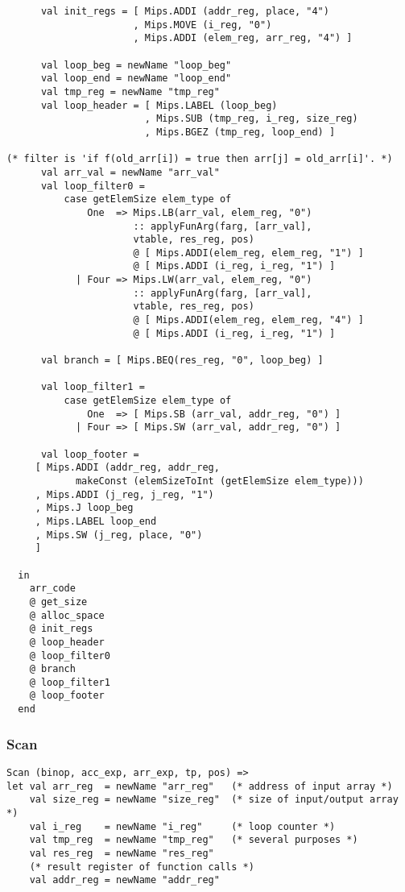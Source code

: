 \documentclass[12pt]{article}
\begin{document}
\begin{center}
\begin{center}
\begin{verbatim}
      val init_regs = [ Mips.ADDI (addr_reg, place, "4")
                      , Mips.MOVE (i_reg, "0")
                      , Mips.ADDI (elem_reg, arr_reg, "4") ]

      val loop_beg = newName "loop_beg"
      val loop_end = newName "loop_end"
      val tmp_reg = newName "tmp_reg"
      val loop_header = [ Mips.LABEL (loop_beg)
                        , Mips.SUB (tmp_reg, i_reg, size_reg)
                        , Mips.BGEZ (tmp_reg, loop_end) ]

(* filter is 'if f(old_arr[i]) = true then arr[j] = old_arr[i]'. *)
      val arr_val = newName "arr_val"
      val loop_filter0 =
          case getElemSize elem_type of
              One  => Mips.LB(arr_val, elem_reg, "0")
                      :: applyFunArg(farg, [arr_val], 
                      vtable, res_reg, pos)
                      @ [ Mips.ADDI(elem_reg, elem_reg, "1") ]
                      @ [ Mips.ADDI (i_reg, i_reg, "1") ]
            | Four => Mips.LW(arr_val, elem_reg, "0")
                      :: applyFunArg(farg, [arr_val], 
                      vtable, res_reg, pos)
                      @ [ Mips.ADDI(elem_reg, elem_reg, "4") ]
                      @ [ Mips.ADDI (i_reg, i_reg, "1") ]

      val branch = [ Mips.BEQ(res_reg, "0", loop_beg) ]

      val loop_filter1 =
          case getElemSize elem_type of
              One  => [ Mips.SB (arr_val, addr_reg, "0") ]
            | Four => [ Mips.SW (arr_val, addr_reg, "0") ]

      val loop_footer =
     [ Mips.ADDI (addr_reg, addr_reg,
            makeConst (elemSizeToInt (getElemSize elem_type)))
     , Mips.ADDI (j_reg, j_reg, "1")
     , Mips.J loop_beg
     , Mips.LABEL loop_end
     , Mips.SW (j_reg, place, "0")
     ]

  in
    arr_code
    @ get_size
    @ alloc_space
    @ init_regs
    @ loop_header
    @ loop_filter0
    @ branch
    @ loop_filter1
    @ loop_footer
  end
\end{verbatim}
\hfill
\hfill
\subsubsection{Scan}
\begin{verbatim}
Scan (binop, acc_exp, arr_exp, tp, pos) =>
let val arr_reg  = newName "arr_reg"   (* address of input array *)
    val size_reg = newName "size_reg"  (* size of input/output array *)
    val i_reg    = newName "i_reg"     (* loop counter *)
    val tmp_reg  = newName "tmp_reg"   (* several purposes *)
    val res_reg  = newName "res_reg"   
    (* result register of function calls *)
    val addr_reg = newName "addr_reg"


\end{verbatim}
\end{center}
\end{center}
\end{document}
